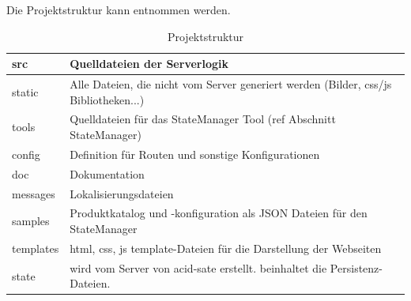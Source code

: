 Die Projektstruktur kann  entnommen werden.

\begin{table}[h!]
  \centering
  \begin{tabular}{|l|p{12cm}|}
    \hline
    \textsf{src} & Quelldateien der Serverlogik \\
    \hline
    \textsf{static} & Alle Dateien, die nicht vom Server generiert werden (Bilder, css/js Bibliotheken...) \\
    \hline
    \textsf{tools} & Quelldateien für das StateManager Tool (ref Abschnitt StateManager) \\
    \hline
    \textsf{config} & Definition für Routen und sonstige Konfigurationen \\
    \hline
    \textsf{doc} & Dokumentation \\
    \hline
    \textsf{messages} & Lokalisierungsdateien \\
    \hline
    \textsf{samples} & Produktkatalog und -konfiguration als JSON Dateien für den StateManager \\
    \hline
    \textsf{templates} & html, css, js template-Dateien für die Darstellung der Webseiten \\
    \hline
    \textsf{state} & wird vom Server von acid-sate erstellt. beinhaltet die Persistenz-Dateien. \\
    \hline
  \end{tabular}
  \caption{Projektstruktur}
  \label{tbl:Projektstruktur}
\end{table}

\newpage


